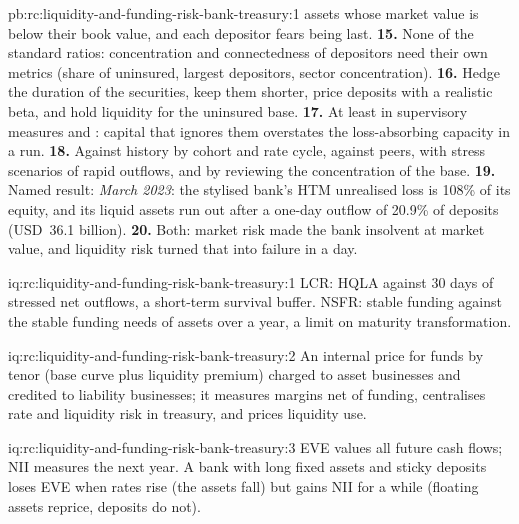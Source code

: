 \begin{solution}{pb:rc:liquidity-and-funding-risk-bank-treasury:1}
assets whose market value is below their book value, and each depositor fears being last.
\textbf{15.} None of the standard ratios: concentration and connectedness of depositors need their own
metrics (share of uninsured, largest depositors, sector concentration).
\textbf{16.} Hedge the duration of the securities, keep them shorter, price deposits with a realistic
beta, and hold liquidity for the uninsured base.
\textbf{17.} At least in supervisory measures and : capital that ignores them overstates
the loss-absorbing capacity in a run.
\textbf{18.} Against history by cohort and rate cycle, against peers, with stress scenarios of rapid
outflows, and by reviewing the concentration of the base.
\textbf{19.} Named result: \emph{March 2023}: the stylised bank's HTM unrealised loss is 108\% of its
equity, and its liquid assets run out after a one-day outflow of 20.9\% of deposits (USD~36.1 billion).
\textbf{20.} Both: market risk made the bank insolvent at market value, and liquidity risk turned that
into failure in a day.
\end{solution}

\begin{solution}{iq:rc:liquidity-and-funding-risk-bank-treasury:1}
LCR: HQLA against 30 days of stressed net outflows, a short-term survival buffer. NSFR: stable funding
against the stable funding needs of assets over a year, a limit on maturity transformation.
\end{solution}

\begin{solution}{iq:rc:liquidity-and-funding-risk-bank-treasury:2}
An internal price for funds by tenor (base curve plus liquidity premium) charged to asset businesses
and credited to liability businesses; it measures margins net of funding, centralises rate and
liquidity risk in treasury, and prices liquidity use.
\end{solution}

\begin{solution}{iq:rc:liquidity-and-funding-risk-bank-treasury:3}
EVE values all future cash flows; NII measures the next year. A bank with long fixed assets and
sticky deposits loses EVE when rates rise (the assets fall) but gains NII for a while (floating
assets reprice, deposits do not).
\end{solution}

